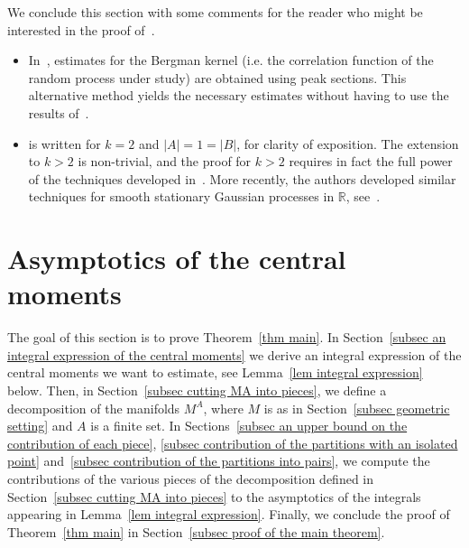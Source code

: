 \documentclass[AHL,Unicode,longabstracts,published]{cedram}
\newcommand{\R}{\mathbb{R}}
\begin{document}
\begin{remas}\label{rem Michele's paper}
We conclude this section with some comments for the reader who might be interested in the proof of~\cite[Proposition~3.2]{Anc2019}.
\begin{itemize}
\item In~\cite{Anc2019}, estimates for the Bergman kernel (i.e. the correlation function of the random process under study) are obtained using peak sections. This alternative method yields the necessary estimates without having to use the results of~\cite{MM2007,MM2015}.

\item \cite[the proof of Proposition~3.2]{Anc2019} is written for $k=2$ and $|A|=1=|B|$, for clarity of exposition. The extension to $k >2$ is non-trivial, and the proof for $k >2$ requires in fact the full power of the techniques developed in~\cite[Section~4]{Anc2019}. More recently, the authors developed similar techniques for smooth stationary Gaussian processes in $\R$, see~\cite[Theorem~1.14]{AL2020}.
\end{itemize}
\end{remas}



\section{Asymptotics of the central moments}\label{sec asymptotics of the central moments}

The goal of this section is to prove Theorem~\ref{thm main}. In Section~\ref{subsec an integral expression of the central moments} we derive an integral expression of the central moments we want to estimate, see Lemma~\ref{lem integral expression} below. Then, in Section~\ref{subsec cutting MA into pieces}, we define a decomposition of the manifolds $M^A$, where $M$ is as in Section~\ref{subsec geometric setting} and $A$ is a finite set. In Sections~\ref{subsec an upper bound on the contribution of each piece}, \ref{subsec contribution of the partitions with an isolated point} and~\ref{subsec contribution of the partitions into pairs}, we compute the contributions of the various pieces of the decomposition defined in Section~\ref{subsec cutting MA into pieces} to the asymptotics of the integrals appearing in Lemma~\ref{lem integral expression}. Finally, we conclude the proof of Theorem~\ref{thm main} in Section~\ref{subsec proof of the main theorem}.
\end{document}
